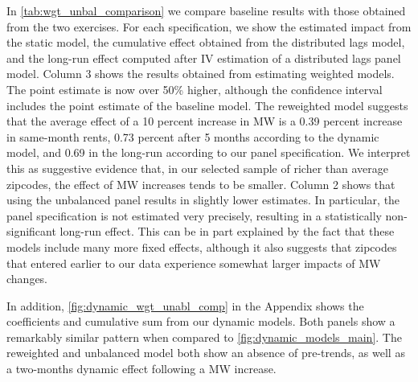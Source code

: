 In \autoref{tab:wgt_unbal_comparison} we compare baseline results with those obtained from the 
two exercises. For each specification, we show the estimated impact from the static model, the 
cumulative effect obtained from the distributed lags model, and the long-run effect computed after
IV estimation of a distributed lags panel model. Column 3 shows the results obtained from 
estimating weighted models. The point estimate is now over 50\% higher, although the confidence 
interval includes the point estimate of the baseline model. The reweighted model suggests that the 
average effect of a 10 percent increase in MW is a 0.39 percent increase in same-month rents, 0.73 
percent after 5 months according to the dynamic model, and 0.69 in the long-run according to our 
panel specification. We interpret this as suggestive evidence that, in our selected sample of 
richer than average zipcodes, the effect of MW increases tends to be smaller. Column 2 shows that 
using the unbalanced panel results in slightly lower estimates. In particular, the panel 
specification is not estimated very precisely, resulting in a statistically non-significant 
long-run effect. This can be in part explained by the fact that these models include many more 
fixed effects, although it also suggests that zipcodes that entered earlier to our data experience 
somewhat larger impacts of MW changes.

In addition, \autoref{fig:dynamic_wgt_unabl_comp} in the Appendix shows the coefficients and 
cumulative sum from our dynamic models. Both panels show a remarkably similar pattern when compared 
to \autoref{fig:dynamic_models_main}. The reweighted and unbalanced model both show an absence of 
pre-trends, as well as a two-months dynamic effect following a MW increase.


